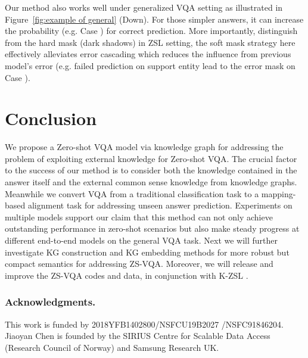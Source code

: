 \documentclass[runningheads]{llncs}
\newcommand{\cjy}[1]{{\color{black}#1}}
\begin{document}
Our method also works well under generalized VQA setting as illustrated in Figure~\ref{fig:example of general} (Down). For those simpler answers, it can increase the probability (e.g. Case ) for correct prediction. More importantly, distinguish from the hard mask (dark shadows) in ZSL setting, the soft mask strategy here effectively alleviates error cascading which reduces the influence from previous model's error (e.g. failed prediction on support entity lead to the error mask on Case ).
\section{Conclusion}
We propose a Zero-shot VQA model via knowledge graph for addressing the problem of exploiting external knowledge for Zero-shot VQA. 
\cjy{The crucial factor} to the success of our method is to consider both the knowledge contained in \cjy{the} answer itself and the external common sense knowledge from knowledge graphs. Meanwhile we convert VQA from a traditional classification task to a mapping-based alignment task for \cjy{addressing} unseen answer prediction.
Experiments on multiple models support our claim that this method \cjy{can not only} achieve outstanding performance in zero-shot scenarios but also make steady progress at different end-to-end models on \cjy{the general VQA task}. 
Next we will further investigate KG construction and KG embedding \cjy{methods for more robust but compact semantics for addressing ZS-VQA. }
Moreover, we will release and improve the ZS-VQA codes and data, in conjunction with K-ZSL \cite{DBLP:journals/corr/abs-2106-15047}.

\subsubsection{Acknowledgments.}
This work is funded by 2018YFB1402800/NSFCU19B2027 /NSFC91846204.
Jiaoyan Chen is founded by the SIRIUS Centre for Scalable Data Access (Research Council of Norway) and Samsung Research UK.








\end{document}
